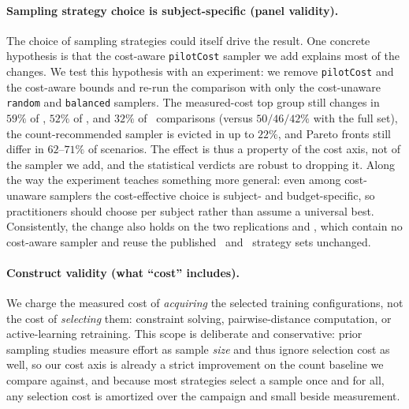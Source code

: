 \paragraph*{Sampling strategy choice is subject-specific (panel validity).}
The choice of sampling strategies could itself drive the result. One concrete
hypothesis is that the cost-aware \texttt{pilotCost} sampler we add explains most
of the changes. We test this hypothesis with an experiment: we remove
\texttt{pilotCost} and the cost-aware bounds and re-run the comparison with only
the cost-unaware \texttt{random} and \texttt{balanced} samplers. The measured-cost
top group still changes in $59\%$ of \StudyEnergy, $52\%$ of \StudyWorkload, and
$32\%$ of \StudyLCBench\ comparisons (versus $50/46/42\%$ with the full set), the
count-recommended sampler is evicted in up to $22\%$, and Pareto fronts still
differ in $62$--$71\%$ of scenarios. The effect is thus a property of the cost
axis, not of the sampler we add, and the statistical verdicts are robust to
dropping it. Along the way the experiment teaches something more general: even
among cost-unaware samplers the cost-effective choice is subject- and
budget-specific, so practitioners should choose per subject rather than assume a
universal best. Consistently, the change also holds on the two replications and
\StudyLinux, which contain no cost-aware sampler and reuse the published
\StudyReplicationICSE\ and \StudyReplicationICPE\ strategy sets unchanged.

\paragraph*{Construct validity (what ``cost'' includes).}
We charge the measured cost of \emph{acquiring} the selected training
configurations, not the cost of \emph{selecting} them: constraint solving,
pairwise-distance computation, or active-learning retraining. This scope is
deliberate and conservative: prior sampling studies measure effort as sample
\emph{size} and thus ignore selection cost as well, so our cost axis is already a
strict improvement on the count baseline we compare against, and because most
strategies select a sample once and for all, any selection cost is amortized over
the campaign and small beside measurement.

